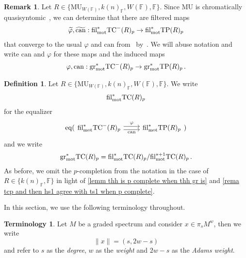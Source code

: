 \documentclass[english,10pt]{amsart}
\newcommand{\field}{\mathbb{F}}
\theoremstyle{definition}
\newtheorem{defi}{Definition}[section]
\newtheorem{rema}{Remark}[section]
\newtheorem{term}{Terminology}[section]
\numberwithin{equation}{section}
\newcommand{\mot}{\textup{mot}}
\begin{document}
\begin{rema}
Let $R\in \{\mathrm{MU}_{W(\field)},k(n)_{\field},W(\field),\field\}$. Since $\mathrm{MU}$ is chromatically quasisyntomic~\cite[Example~1.3.3,~Definition~4.1.12]{hahn2022motivic}, we can determine that there are filtered maps 
\[ 
\widetilde{\varphi},\widetilde{\mathrm{can}} : \mathrm{fil}_{\textup{mot}}^*\mathrm{TC}^{-}(R)_p\to \mathrm{fil}_{\textup{mot}}^*\mathrm{TP}(R)_p
\]
that converge to the usual $\varphi$ and $\mathrm{can}$ from~\cite{nikolausscholze2018topologicalcyclic} by~\cite[Corollary~A.2.10,~Remark~4.2.10]{hahn2022motivic}.  We will abuse notation and write $\mathrm{can}$ and $\varphi$ for these maps and the induced maps 
\[ 
\varphi,\mathrm{can} : \mathrm{gr}_{\textup{mot}}^*\mathrm{TC}^{-}(R)_p\to \mathrm{gr}_{\textup{mot}}^*\mathrm{TP}(R)_p \,.
\]

\end{rema}
\begin{defi}\label{syntomic-coh-def}
Let $R\in \{\mathrm{MU}_{W(\field)},k(n)_{\field},W(\field),\field\}$. We write 
\[ \mathrm{fil}_{\mot}^*\mathrm{TC}(R)_p \]
for the equalizer 
\[ 
\mathrm{eq}(
\begin{tikzcd}
\mathrm{fil}_{\textup{mot}}^*\mathrm{TC}^{-}(R)_p
\arrow[r,shift right,"\textup{can}",swap] 
\arrow[r,shift left,"\varphi"]  & \mathrm{fil}_{\textup{mot}}^*\mathrm{TP}(R)_p
\end{tikzcd}
) 
\]
and we write 
\[ \mathrm{gr}_{\mot}^*\mathrm{TC}(R)_p= \mathrm{fil}_{\mot}^*\mathrm{TC}(R)_p/ \mathrm{fil}_{\mot}^{*+1}\mathrm{TC}(R)_p\,.
\]
As before, we omit the $p$-completion from the notation in the case of $R\in \{k(n)_{\field},\field\}$ in light of \autoref{lemm thh is p complete when thh gr is} and \autoref{rema tcp and then hs1 agree with ts1 when p complete}. 
\end{defi}

In this section, we use the following terminology throughout. 
\begin{term}
Let $M$ be a graded spectrum and consider $x\in \pi_sM^w$, then we write 
\[\| x\|=(s,2w-s)\] 
and refer to $s$ as the \emph{degree}, $w$ as the \emph{weight} and $2w-s$ as the \emph{Adams weight}. 
\end{term}
\end{document}
